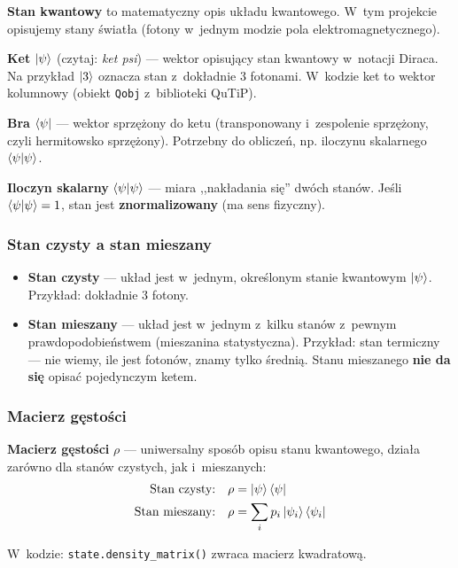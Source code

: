 \documentclass[12pt,a4paper]{article}
\begin{document}
\textbf{Stan kwantowy} to matematyczny opis układu kwantowego. W~tym projekcie opisujemy stany światła (fotony w~jednym modzie pola elektromagnetycznego).

\textbf{Ket} $\ket{\psi}$ (czytaj: \emph{ket psi}) --- wektor opisujący stan kwantowy w~notacji Diraca. Na przykład $\ket{3}$ oznacza stan z~dokładnie 3 fotonami. W~kodzie ket to wektor kolumnowy (obiekt \texttt{Qobj} z~biblioteki QuTiP).

\textbf{Bra} $\bra{\psi}$ --- wektor sprzężony do ketu (transponowany i~zespolenie sprzężony, czyli hermitowsko sprzężony). Potrzebny do obliczeń, np. iloczynu skalarnego $\braket{\psi|\psi}$.

\textbf{Iloczyn skalarny} $\braket{\psi|\psi}$ --- miara ,,nakładania się'' dwóch stanów. Jeśli $\braket{\psi|\psi} = 1$, stan jest \textbf{znormalizowany} (ma sens fizyczny).

\subsubsection{Stan czysty a stan mieszany}

\begin{itemize}
    \item \textbf{Stan czysty} --- układ jest w~jednym, określonym stanie kwantowym $\ket{\psi}$. Przykład: dokładnie 3 fotony.
    \item \textbf{Stan mieszany} --- układ jest w~jednym z~kilku stanów z~pewnym prawdopodobieństwem (mieszanina statystyczna). Przykład: stan termiczny --- nie wiemy, ile jest fotonów, znamy tylko średnią. Stanu mieszanego \textbf{nie da się} opisać pojedynczym ketem.
\end{itemize}

\subsubsection{Macierz gęstości}

\textbf{Macierz gęstości} $\rho$ --- uniwersalny sposób opisu stanu kwantowego, działa zarówno dla stanów czystych, jak i~mieszanych:
\begin{align}
    \text{Stan czysty:} \quad & \rho = \ket{\psi}\bra{\psi} \label{eq:rho-pure} \\
    \text{Stan mieszany:} \quad & \rho = \sum_i p_i \ket{\psi_i}\bra{\psi_i} \label{eq:rho-mixed}
\end{align}

\noindent W~kodzie: \texttt{state.density\_matrix()} zwraca macierz kwadratową.
\end{document}
